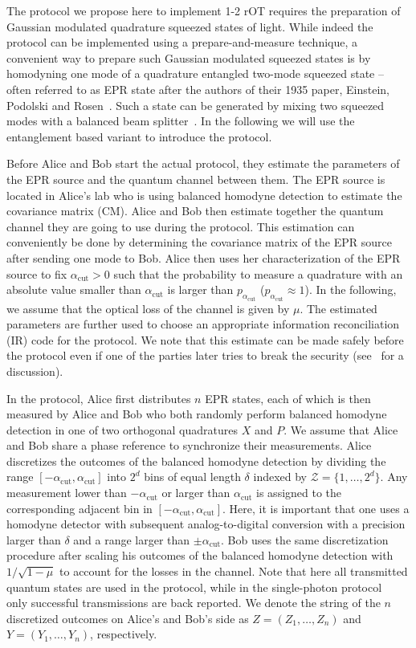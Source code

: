 \documentclass[aps,amsfonts,twoside,amssymb,superscriptaddress,twocolumn]{revtex4-1}
\newcommand*{\cZ}{\mathcal{Z}}
\begin{document}
The protocol we propose here to implement 1-2 rOT requires the preparation of Gaussian modulated quadrature squeezed states of light. 
While indeed the protocol can be implemented using a prepare-and-measure technique, a convenient way to prepare such Gaussian modulated squeezed states is by homodyning one mode of a quadrature entangled two-mode squeezed state -- often referred to as EPR state after the authors of their 1935 paper, Einstein, Podolski and Rosen~\cite{epr35}. Such a state can be generated by mixing two squeezed modes with a balanced beam splitter~\cite{Furusawa1998,Eberle2013}. 
In the following we will use the entanglement based variant to introduce the protocol.

Before Alice and Bob start the actual protocol, they estimate the parameters of the EPR source and the quantum channel between them. The EPR source is located in Alice's lab who is using balanced homodyne detection to estimate the covariance matrix (CM). Alice and Bob then estimate together the quantum channel they are going to use during the protocol. This estimation can conveniently be done by determining the covariance matrix of the EPR source after sending one mode to Bob. Alice then uses her characterization of the EPR source to fix $\alpha_\text{cut} > 0$ such that the probability to measure a quadrature with an absolute value smaller than $\alpha_\text{cut}$ is larger than $p_{\alpha_\text{cut}}$ ($p_{\alpha_\text{cut}} \approx 1$). In the following, we assume that the optical loss of the channel is given by $\mu$. The estimated parameters are further used to choose an appropriate information reconciliation (IR) code for the protocol. We note that this estimate can be made safely before the protocol even if one of the parties later tries to break the security (see~\cite{erven2014experimental} for a discussion). 

In the protocol, Alice first distributes $n$ EPR states, each of which is then measured by Alice and Bob who both randomly perform balanced homodyne detection in one of two orthogonal quadratures $X$ and $P$. We assume that Alice and Bob share a phase reference to synchronize their measurements. Alice discretizes the outcomes of the balanced homodyne detection by dividing the range $[-\alpha_\text{cut},\alpha_\text{cut}]$ into $2^d$ bins of equal length $\delta$ indexed by $\cZ = \{1,\ldots,2^d\}$. Any measurement lower than $-\alpha_\text{cut}$ or larger than $\alpha_\text{cut}$ is assigned to the corresponding adjacent bin in $[-\alpha_\text{cut},\alpha_\text{cut}]$. Here, it is important that one uses a homodyne detector with subsequent analog-to-digital conversion with a precision larger than $\delta$ and a range larger than $\pm\alpha_\text{cut}$. 
Bob uses the same discretization procedure after scaling his outcomes of the balanced homodyne detection with $1/\sqrt{1-\mu}$ to account for the losses in the channel. Note that here all transmitted quantum states are used in the protocol, while in the single-photon protocol~\cite{ng2012,erven2014experimental} only successful transmissions are back reported. We denote the string of the $n$ discretized outcomes on Alice's and Bob's side as $Z=(Z_1,\ldots,Z_n)$ and $Y=(Y_1,\ldots,Y_n)$, respectively.  
\end{document}
